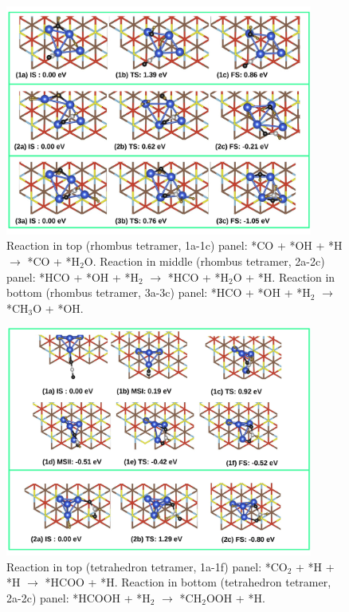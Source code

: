 \begin{figure}
  \begin{center}
    \includegraphics[width=0.9\textwidth]{./Appendix3/figures_si/p_112.jpg}
  \end{center}
    \caption{ Reaction in top (rhombus tetramer, 1a-1c) panel: *CO + *OH + *H $\rightarrow$ *CO + *H$_2$O. Reaction in middle (rhombus tetramer, 2a-2c) panel: *HCO + *OH + *H$_2$ $\rightarrow$ *HCO + *H$_2$O + *H. Reaction in bottom (rhombus tetramer, 3a-3c) panel: *HCO + *OH + *H$_2$ $\rightarrow$ *CH$_3$O + *OH.  }
  \label{fig:si-112}
\end{figure}

\begin{figure}
  \begin{center}
    \includegraphics[width=0.9\textwidth]{./Appendix3/figures_si/p_113.jpg}
  \end{center}
    \caption{ Reaction in top (tetrahedron tetramer, 1a-1f) panel: *CO$_2$ + *H + *H $\rightarrow$ *HCOO + *H. Reaction in bottom (tetrahedron tetramer, 2a-2c) panel: *HCOOH + *H$_2$ $\rightarrow$ *CH$_2$OOH + *H.  }
  \label{fig:si-113}
\end{figure}


